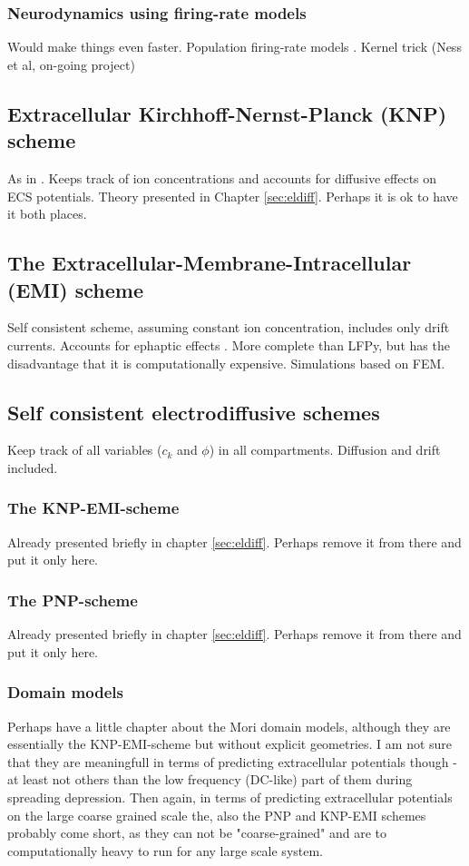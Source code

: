 \subsubsection{Neurodynamics using firing-rate models}
Would make things even faster. Population firing-rate models  \citep{Hagen2016}. Kernel trick (Ness et al, on-going project) 


\subsection{Extracellular Kirchhoff-Nernst-Planck (KNP) scheme}
As in \cite{Solbra2018}. Keeps track of ion concentrations and accounts for diffusive effects on ECS potentials. Theory presented in Chapter \ref{sec:eldiff}. Perhaps it is ok to have it both places. 


\subsection{The Extracellular-Membrane-Intracellular (EMI) scheme}
Self consistent scheme, assuming constant ion concentration, includes only drift currents. Accounts for ephaptic effects \cite{Tveito2019}. More complete than LFPy, but has the disadvantage that it is computationally expensive. Simulations based on FEM.


\subsection{Self consistent electrodiffusive schemes}
Keep track of all variables ($c_k$ and $\phi$) in all compartments. Diffusion and drift included. 

\subsubsection{The KNP-EMI-scheme}
Already presented briefly in chapter \ref{sec:eldiff}. Perhaps remove it from there and put it only here. 

\subsubsection{The PNP-scheme}
Already presented briefly in chapter \ref{sec:eldiff}. Perhaps remove it from there and put it only here. 

\subsubsection{Domain models}
Perhaps have a little chapter about the Mori domain models, although they are essentially the KNP-EMI-scheme but without explicit geometries. I am not sure that they are meaningfull in terms of predicting extracellular potentials though - at least not others than the low frequency (DC-like) part of them during spreading depression. Then again, in terms of predicting extracellular potentials on the large coarse grained scale the, also the PNP and KNP-EMI schemes probably come short, as they can not be "coarse-grained" and are to computationally heavy to run for any large scale system. 



